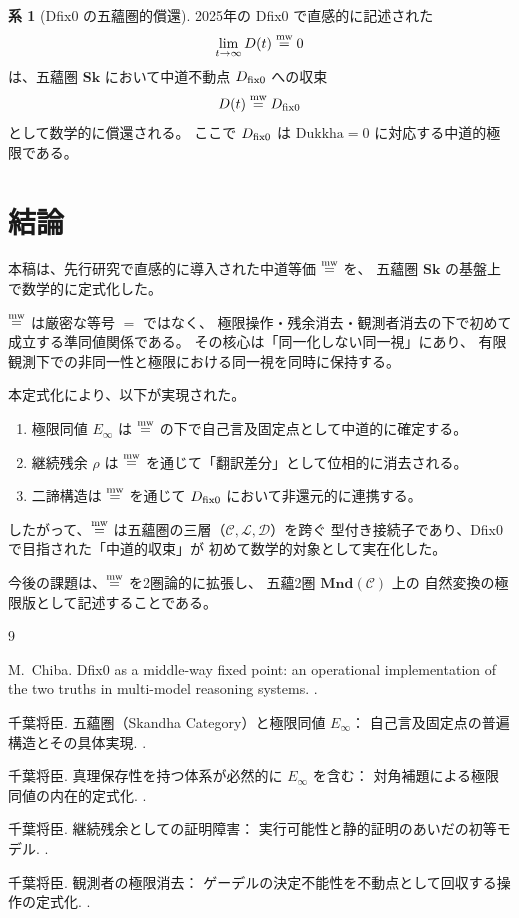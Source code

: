 \documentclass[11pt,a4paper]{article}
\theoremstyle{definition}
\newtheorem{corollary}{系}[section]
\newcommand{\Sk}{\mathbf{Sk}}
\newcommand{\C}{\mathcal{C}}
\newcommand{\Lspace}{\mathcal{L}}
\newcommand{\Dspace}{\mathcal{D}}
\newcommand{\Einfty}{E_{\infty}}
\begin{document}
\begin{corollary}[Dfix0 の五蘊圏的償還]
2025年の Dfix0 で直感的に記述された
\[
\lim_{t\to\infty}D(t)\mathrel{\overset{\mathrm{mw}}{=}} 0
\]
は、五蘊圏 $\Sk$ において中道不動点 $D_{\mathrm{fix}0}$ への収束
\[
D(t)\mathrel{\overset{\mathrm{mw}}{=}}D_{\mathrm{fix}0}
\]
として数学的に償還される。
ここで $D_{\mathrm{fix}0}$ は $\mathrm{Dukkha}=0$ に対応する中道的極限である。
\end{corollary}

\section{結論}

本稿は、先行研究で直感的に導入された中道等価 $\mathrel{\overset{\mathrm{mw}}{=}}$ を、
五蘊圏 $\Sk$ の基盤上で数学的に定式化した。

$\mathrel{\overset{\mathrm{mw}}{=}}$ は厳密な等号 $=$ ではなく、
極限操作・残余消去・観測者消去の下で初めて成立する準同値関係である。
その核心は「同一化しない同一視」にあり、
有限観測下での非同一性と極限における同一視を同時に保持する。

本定式化により、以下が実現された。
\begin{enumerate}[label=(\arabic*)]
  \item 極限同値 $\Einfty$ は $\mathrel{\overset{\mathrm{mw}}{=}}$ の下で自己言及固定点として中道的に確定する。
  \item 継続残余 $\rho$ は $\mathrel{\overset{\mathrm{mw}}{=}}$ を通じて「翻訳差分」として位相的に消去される。
  \item 二諦構造は $\mathrel{\overset{\mathrm{mw}}{=}}$ を通じて $D_{\mathrm{fix}0}$ において非還元的に連携する。
\end{enumerate}

したがって、$\mathrel{\overset{\mathrm{mw}}{=}}$ は五蘊圏の三層（$\C,\Lspace,\Dspace$）を跨ぐ
型付き接続子であり、Dfix0 で目指された「中道的収束」が
初めて数学的対象として実在化した。

今後の課題は、$\mathrel{\overset{\mathrm{mw}}{=}}$ を2圏論的に拡張し、
五蘊2圏 $\mathbf{Mnd}(\mathcal{C})$ 上の
自然変換の極限版として記述することである。

\begin{thebibliography}{9}

M.~Chiba.
\newblock Dfix0 as a middle-way fixed point: an operational implementation of
  the two truths in multi-model reasoning systems.
.

千葉将臣.
\newblock 五蘊圏（Skandha Category）と極限同値 $E_\infty$：
  自己言及固定点の普遍構造とその具体実現.
.

千葉将臣.
\newblock 真理保存性を持つ体系が必然的に $E_\infty$ を含む：
  対角補題による極限同値の内在的定式化.
.

千葉将臣.
\newblock 継続残余としての証明障害：
  実行可能性と静的証明のあいだの初等モデル.
.

千葉将臣.
\newblock 観測者の極限消去：
  ゲーデルの決定不能性を不動点として回収する操作の定式化.
.

\end{thebibliography}
\end{document}
